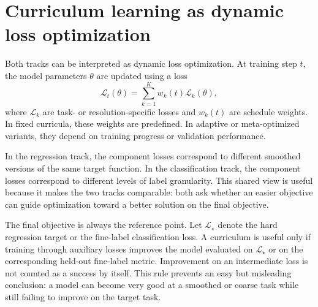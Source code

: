 \documentclass[english,master,a4paper,oneside]{ppfcmthesis}
\begin{document}
\section{Curriculum learning as dynamic loss optimization}

Both tracks can be interpreted as dynamic loss optimization. At training step
$t$, the model parameters $\theta$ are updated using a loss
\begin{equation}
    \mathcal{L}_t(\theta) = \sum_{k=1}^{K} w_k(t)\mathcal{L}_k(\theta),
\end{equation}
where $\mathcal{L}_k$ are task- or resolution-specific losses and $w_k(t)$ are
schedule weights. In fixed curricula, these weights are predefined. In adaptive
or meta-optimized variants, they depend on training progress or validation
performance.

In the regression track, the component losses correspond to different smoothed
versions of the same target function. In the classification track, the component
losses correspond to different levels of label granularity. This shared view is
useful because it makes the two tracks comparable: both ask whether an easier
objective can guide optimization toward a better solution on the final objective.

The final objective is always the reference point. Let \(\mathcal{L}_\star\)
denote the hard regression target or the fine-label classification loss. A
curriculum is useful only if training through auxiliary losses improves the
model evaluated on \(\mathcal{L}_\star\) or on the corresponding held-out
fine-label metric. Improvement on an intermediate loss is not counted as a
success by itself. This rule prevents an easy but misleading conclusion: a model
can become very good at a smoothed or coarse task while still failing to improve
on the target task.
\end{document}
